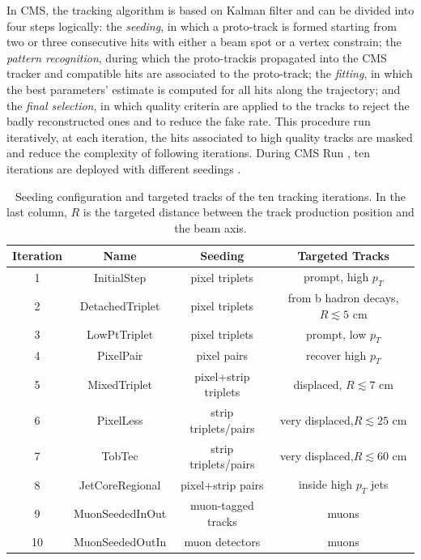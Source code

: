 In CMS, the tracking algorithm is based on Kalman filter and can be divided into four steps logically: the \textit{seeding}, in which a proto-track is formed starting from two or three consecutive hits with either a beam spot or a vertex constrain; the \textit{pattern recognition}, during which the proto-trackis propagated into the CMS tracker and compatible hits are associated to the proto-track; the \textit{fitting}, in which the best parameters’ estimate is computed for all hits along the  trajectory; and the \textit{final selection}, in which quality criteria are applied to the tracks to reject the badly reconstructed ones and to reduce the fake rate. This procedure run iteratively, at each iteration, the hits associated to high quality tracks are masked and reduce the complexity of following iterations. During CMS Run , ten iterations are deployed with different seedings \cite{CMSPFreconstruction}.
\onecolumngrid
\begin{table}[!htbp]
    \centering
    \caption{Seeding configuration and targeted tracks of the ten tracking iterations. In the last column, $R$ is the targeted distance between the track production position and the beam axis.}
    \begin{tabular}{cccc}
    \hline
    Iteration  &  Name & Seeding  & Targeted Tracks \\
    \hline
    1  &  InitialStep       &  pixel triplets       & prompt, high $p_T$ \\
    2  &  DetachedTriplet   &  pixel triplets       & from b hadron decays,$R \apprle 5$ cm \\
    3  &  LowPtTriplet      &  pixel triplets       & prompt, low $p_T$ \\
    4  &  PixelPair         &  pixel pairs          & recover high $p_T$ \\
    5  &  MixedTriplet      &  pixel+strip triplets & displaced, $R \apprle 7$ cm \\
    6  &  PixelLess         &  strip triplets/pairs & very displaced,$R \apprle 25$ cm \\
    7  &  TobTec            &  strip triplets/pairs & very displaced,$R \apprle 60$ cm \\
    8  &  JetCoreRegional   &  pixel+strip pairs    & inside high $p_T$  jets   \\
    9  &  MuonSeededInOut   &  muon-tagged tracks   & muons  \\
    10 &  MuonSeededOutIn   &  muon detectors       & muons \\
    \hline
    \end{tabular}
    \label{tab:my_label}
\end{table}
\twocolumngrid

